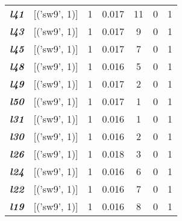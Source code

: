 \begin{table}
\begin{tabular}{llccccc}
    \textit{\textbf{l41}}                                           & {[}('sw9', 1){]}  & 1             & 0.017              & 11             & 0              & 1           \\
    \textit{\textbf{l43}}                                           & {[}('sw9', 1){]}  & 1             & 0.017              & 9              & 0              & 1           \\
    \textit{\textbf{l45}}                                           & {[}('sw9', 1){]}  & 1             & 0.017              & 7              & 0              & 1           \\
    \textit{\textbf{l48}}                                           & {[}('sw9', 1){]}  & 1             & 0.016              & 5              & 0              & 1           \\
    \textit{\textbf{l49}}                                           & {[}('sw9', 1){]}  & 1             & 0.017              & 2              & 0              & 1           \\
    \textit{\textbf{l50}}                                           & {[}('sw9', 1){]}  & 1             & 0.017              & 1              & 0              & 1           \\
    \textit{\textbf{l31}}                                           & {[}('sw9', 1){]}  & 1             & 0.016              & 1              & 0              & 1           \\
    \textit{\textbf{l30}}                                           & {[}('sw9', 1){]}  & 1             & 0.016              & 2              & 0              & 1           \\
    \textit{\textbf{l26}}                                           & {[}('sw9', 1){]}  & 1             & 0.018              & 3              & 0              & 1           \\
    \textit{\textbf{l24}}                                           & {[}('sw9', 1){]}  & 1             & 0.016              & 6              & 0              & 1           \\
    \textit{\textbf{l22}}                                           & {[}('sw9', 1){]}  & 1             & 0.016              & 7              & 0              & 1           \\
    \textit{\textbf{l19}}                                           & {[}('sw9', 1){]}  & 1             & 0.016              & 8              & 0              & 1           \\ \hline
    \end{tabular}
    \end{table}